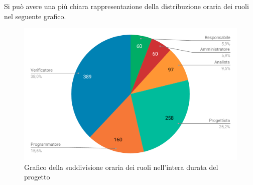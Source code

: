 Si può avere una più chiara rappresentazione della distribuzione oraria dei ruoli nel seguente grafico.

\begin{figure}[H]
	\includegraphics[width=1\linewidth]{Preventivo/grafici/TI2.pdf}
	\caption{Grafico della suddivisione oraria dei ruoli nell'intera durata del progetto}
\end{figure}

